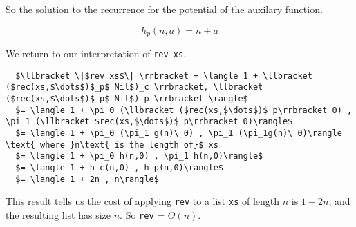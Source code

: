 \documentclass[12pt,letterpaper]{article}
\begin{document}
So the solution to the recurrence for the potential of the auxilary function.
\begin{framed}
  \[h_p(n,a) = n + a \]
\end{framed}


We return to our interpretation of \texttt{rev xs}.
\begin{lstlisting}
  $\llbracket \|$rev xs$\| \rrbracket = \langle 1 + \llbracket ($rec(xs,$\dots$)$_p$ Nil$)_c \rrbracket, \llbracket ($rec(xs,$\dots$)$_p$ Nil$)_p \rrbracket \rangle$
  $= \langle 1 + \pi_0 (\llbracket ($rec(xs,$\dots$)$_p\rrbracket 0) , \pi_1 (\llbracket $rec(xs,$\dots$)$_p\rrbracket 0)\rangle$
  $= \langle 1 + \pi_0 (\pi_1 g(n)\ 0) , \pi_1 (\pi_1g(n)\ 0)\rangle \text{ where }n\text{ is the length of}$ xs
  $= \langle 1 + \pi_0 h(n,0) , \pi_1 h(n,0)\rangle$
  $= \langle 1 + h_c(n,0) , h_p(n,0)\rangle$
  $= \langle 1 + 2n , n\rangle$
\end{lstlisting}


This result tells us the cost of applying \texttt{rev} to a list \texttt{xs} of length $n$ is $1+2n$, and the resulting list has size $n$.
So \texttt{rev} = $\Theta(n)$.
\end{document}
